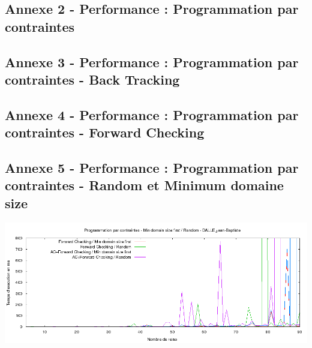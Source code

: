 \documentclass[a4paper,10pt]{article}
\begin{document}
\subsection{Annexe 2 - Performance : Programmation par contraintes}
\subsection{Annexe 3 - Performance : Programmation par contraintes - Back Tracking}
\subsection{Annexe 4 - Performance : Programmation par contraintes - Forward Checking}
\subsection{Annexe 5 - Performance : Programmation par contraintes - Random et Minimum domaine size}
\includegraphics[width=1\textwidth]{Programmation_par_contraintes_-_Random_Min_Domain_Size.png}
\end{document}
